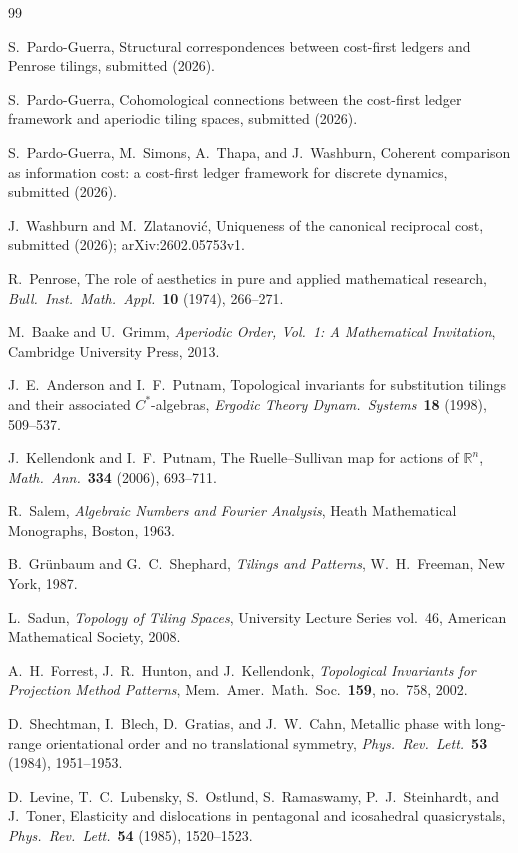 \documentclass[12pt]{article}
\theoremstyle{definition}
\theoremstyle{remark}
\begin{document}
\begin{thebibliography}{99}

S.~Pardo-Guerra,
Structural correspondences between cost-first ledgers and Penrose tilings,
submitted (2026).

S.~Pardo-Guerra,
Cohomological connections between the cost-first ledger framework and aperiodic tiling spaces,
submitted (2026).

S.~Pardo-Guerra, M.~Simons, A.~Thapa, and J.~Washburn,
Coherent comparison as information cost: a cost-first ledger framework for discrete dynamics,
submitted (2026).

J.~Washburn and M.~Zlatanovi\'{c},
Uniqueness of the canonical reciprocal cost,
submitted (2026); arXiv:2602.05753v1.

R.~Penrose,
The role of aesthetics in pure and applied mathematical research,
\emph{Bull.\ Inst.\ Math.\ Appl.}\ \textbf{10} (1974), 266--271.

M.~Baake and U.~Grimm,
\emph{Aperiodic Order, Vol.~1: A Mathematical Invitation},
Cambridge University Press, 2013.

J.~E.~Anderson and I.~F.~Putnam,
Topological invariants for substitution tilings and their associated $C^*$-algebras,
\emph{Ergodic Theory Dynam.\ Systems}\ \textbf{18} (1998), 509--537.

J.~Kellendonk and I.~F.~Putnam,
The Ruelle--Sullivan map for actions of $\mathbb{R}^n$,
\emph{Math.\ Ann.}\ \textbf{334} (2006), 693--711.

R.~Salem,
\emph{Algebraic Numbers and Fourier Analysis},
Heath Mathematical Monographs, Boston, 1963.

B.~Gr\"{u}nbaum and G.~C.~Shephard,
\emph{Tilings and Patterns}, W.~H.~Freeman, New York, 1987.

L.~Sadun,
\emph{Topology of Tiling Spaces},
University Lecture Series vol.~46, American Mathematical Society, 2008.

A.~H.~Forrest, J.~R.~Hunton, and J.~Kellendonk,
\emph{Topological Invariants for Projection Method Patterns},
Mem.\ Amer.\ Math.\ Soc.\ \textbf{159}, no.~758, 2002.

D.~Shechtman, I.~Blech, D.~Gratias, and J.~W.~Cahn,
Metallic phase with long-range orientational order and no translational symmetry,
\emph{Phys.\ Rev.\ Lett.}\ \textbf{53} (1984), 1951--1953.

D.~Levine, T.~C.~Lubensky, S.~Ostlund, S.~Ramaswamy, P.~J.~Steinhardt, and J.~Toner,
Elasticity and dislocations in pentagonal and icosahedral quasicrystals,
\emph{Phys.\ Rev.\ Lett.}\ \textbf{54} (1985), 1520--1523.

\end{thebibliography}
\end{document}
